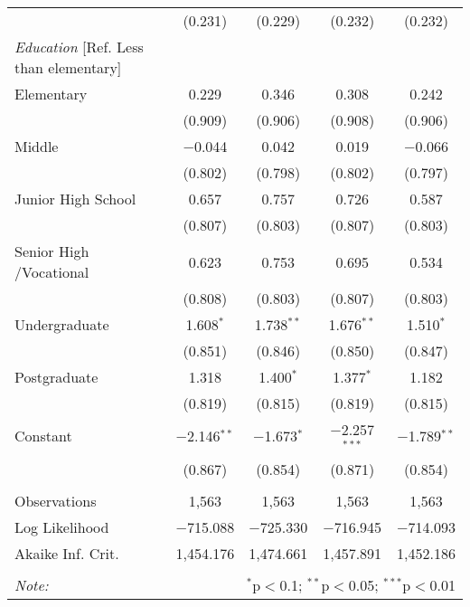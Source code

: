 \documentclass[12pt,a4paper]{article}
\begin{document}
\begin{table}[!h]
\begin{tabular}{@{\extracolsep{5pt}}lcccc}
  & (0.231) & (0.229) & (0.232) & (0.232) \\ 
{\it Education} [Ref. Less than elementary]\\
Elementary & 0.229 & 0.346 & 0.308 & 0.242 \\ 
  & (0.909) & (0.906) & (0.908) & (0.906) \\ 
Middle & $-$0.044 & 0.042 & 0.019 & $-$0.066 \\ 
  & (0.802) & (0.798) & (0.802) & (0.797) \\ 
Junior High School & 0.657 & 0.757 & 0.726 & 0.587 \\ 
  & (0.807) & (0.803) & (0.807) & (0.803) \\ 
Senior High /Vocational & 0.623 & 0.753 & 0.695 & 0.534 \\ 
  & (0.808) & (0.803) & (0.807) & (0.803) \\ 
Undergraduate & 1.608$^{*}$ & 1.738$^{**}$ & 1.676$^{**}$ & 1.510$^{*}$ \\ 
  & (0.851) & (0.846) & (0.850) & (0.847) \\ 
Postgraduate & 1.318 & 1.400$^{*}$ & 1.377$^{*}$ & 1.182 \\ 
  & (0.819) & (0.815) & (0.819) & (0.815) \\ 
  Constant & $-$2.146$^{**}$ & $-$1.673$^{*}$ & $-$2.257$^{***}$ & $-$1.789$^{**}$ \\ 
  & (0.867) & (0.854) & (0.871) & (0.854) \\ 
 \hline \\[-1.8ex] 
Observations & 1,563 & 1,563 & 1,563 & 1,563 \\ 
Log Likelihood & $-$715.088 & $-$725.330 & $-$716.945 & $-$714.093 \\ 
Akaike Inf. Crit. & 1,454.176 & 1,474.661 & 1,457.891 & 1,452.186 \\ 
\hline 
\hline \\[-1.8ex] 
\textit{Note:}  & \multicolumn{4}{r}{$^{*}$p$<$0.1; $^{**}$p$<$0.05; $^{***}$p$<$0.01} \\ 
\end{tabular} 
\end{table} 

\end{document}
